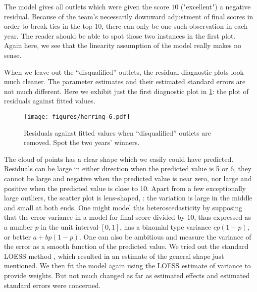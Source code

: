 \documentclass[alpha-refs]{wiley-article}
\newcommand{\rg}[1]{\textcolor{red}{#1}}
\begin{document}
The model gives all outlets which were given the score $10$ ("excellent") a negative residual. Because of the team's necessarily downward adjustment of final scores in order to break ties in the top 10, there can only be one such observation in each year. The reader should be able to spot those two instances in the first plot. Again here, we see that the linearity assumption of the model really makes no sense. 

When we leave out the ``disqualified'' outlets, the residual diagnostic plots look much cleaner. The parameter estimates and their estimated standard errors are not much different.  Here we exhibit just the first diagnostic plot in \cref{fig:model-vali-subset}: the plot of residuals against fitted values.
\begin{figure}
\centering
\texttt{[image: figures/herring-6.pdf]}
\caption{Residuals against fitted values when ``disqualified'' outlets are removed. Spot the two years' winners.}
\label{fig:model-vali-subset}
\end{figure}
The cloud of points has a clear shape which we easily could have predicted. Residuals can be large in either direction when the predicted value is 5 or 6, they cannot be large and negative when the predicted value is near zero, nor large and positive when the predicted value is close to 10. Apart from a few exceptionally large outliers, the scatter plot is lens-shaped, \raisebox{1pt}{$\frac\frown\smile$}: the variation is large in the middle and small at both ends. One might model this heteroscedasticity by supposing that the error variance in a model for final score divided by 10, thus expressed as a number $p$ in the unit interval $[0, 1]$, has a binomial type variance $c p (1 - p)$, or better $a + b p (1 - p)$. One can also be ambitious and measure the variance of the error as a smooth function of the predicted value. We tried out the standard LOESS method \citep*{cleveland1979robust}, 
which resulted in an estimate of the general shape just mentioned.  We then fit the model again using the LOESS estimate of variance to provide weights.  But not much changed as far as estimated effects and estimated standard errors were concerned.
\end{document}
